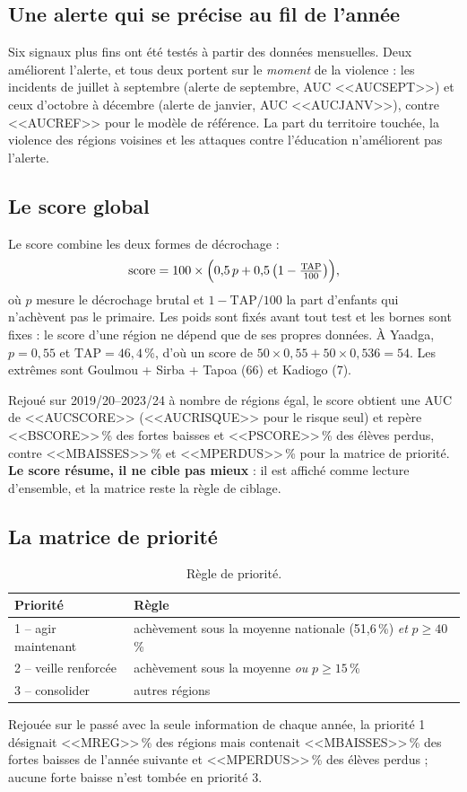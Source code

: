 \documentclass[11pt,a4paper]{article}
\begin{document}
\subsection{Une alerte qui se précise au fil de l'année}
Six signaux plus fins ont été testés à partir des données mensuelles. Deux améliorent l'alerte, et tous deux portent sur le \emph{moment} de la violence : les incidents de juillet à septembre (alerte de septembre, AUC <<AUCSEPT>>) et ceux d'octobre à décembre (alerte de janvier, AUC <<AUCJANV>>), contre <<AUCREF>> pour le modèle de référence. La part du territoire touchée, la violence des régions voisines et les attaques contre l'éducation n'améliorent pas l'alerte.

\subsection{Le score global}
Le score combine les deux formes de décrochage :
\begin{equation}
\text{score} = 100 \times \Bigl(0{,}5\,p + 0{,}5\,\bigl(1 - \tfrac{\text{TAP}}{100}\bigr)\Bigr),
\end{equation}
où $p$ mesure le décrochage brutal et $1-\text{TAP}/100$ la part d'enfants qui n'achèvent pas le primaire. Les poids sont fixés avant tout test et les bornes sont fixes : le score d'une région ne dépend que de ses propres données. À Yaadga, $p = 0{,}55$ et $\text{TAP} = 46{,}4$\,\%, d'où un score de $50 \times 0{,}55 + 50 \times 0{,}536 = 54$. Les extrêmes sont Goulmou + Sirba + Tapoa (66) et Kadiogo (7).

Rejoué sur 2019/20--2023/24 à nombre de régions égal, le score obtient une AUC de <<AUCSCORE>> (<<AUCRISQUE>> pour le risque seul) et repère <<BSCORE>>\,\% des fortes baisses et <<PSCORE>>\,\% des élèves perdus, contre <<MBAISSES>>\,\% et <<MPERDUS>>\,\% pour la matrice de priorité. \textbf{Le score résume, il ne cible pas mieux} : il est affiché comme lecture d'ensemble, et la matrice reste la règle de ciblage.

\subsection{La matrice de priorité}
\begin{table}[H]\centering\small
\begin{tabular}{@{}ll@{}}\toprule
Priorité & Règle\\\midrule
1 -- agir maintenant & achèvement sous la moyenne nationale (51,6\,\%) \emph{et} $p \geq 40$\,\%\\
2 -- veille renforcée & achèvement sous la moyenne \emph{ou} $p \geq 15$\,\%\\
3 -- consolider & autres régions\\\bottomrule
\end{tabular}\caption{Règle de priorité.}\end{table}
Rejouée sur le passé avec la seule information de chaque année, la priorité 1 désignait <<MREG>>\,\% des régions mais contenait <<MBAISSES>>\,\% des fortes baisses de l'année suivante et <<MPERDUS>>\,\% des élèves perdus ; aucune forte baisse n'est tombée en priorité 3.
\end{document}
